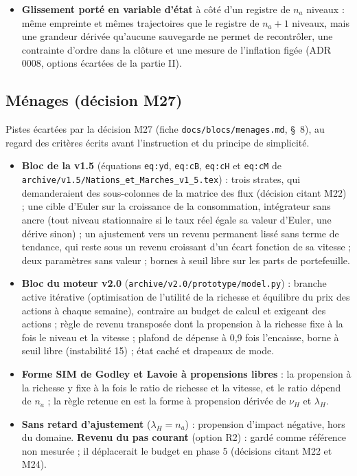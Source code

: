\documentclass[11pt,a4paper]{article}
\begin{document}
\begin{itemize}
\item \textbf{Glissement porté en variable d'état} à côté d'un registre de $n_a$ niveaux : même empreinte et mêmes trajectoires que le registre de $n_a + 1$ niveaux, mais une grandeur dérivée qu'aucune sauvegarde ne permet de recontrôler, une contrainte d'ordre dans la clôture et une mesure de l'inflation figée (ADR 0008, options écartées de la partie II).
\end{itemize}

\subsection*{Ménages (décision M27)}
Pistes écartées par la décision M27 (fiche \nolinkurl{docs/blocs/menages.md}, \S~8), au regard des critères écrits avant l'instruction et du principe de simplicité.
\begin{itemize}
\item \textbf{Bloc de la v1.5} (équations \texttt{eq:yd}, \texttt{eq:cB}, \texttt{eq:cH} et \texttt{eq:cM} de \nolinkurl{archive/v1.5/Nations_et_Marches_v1_5.tex}) : trois strates, qui demanderaient des sous-colonnes de la matrice des flux (décision citant M22) ; une cible d'Euler sur la croissance de la consommation, intégrateur sans ancre (tout niveau stationnaire si le taux réel égale sa valeur d'Euler, une dérive sinon) ; un ajustement vers un revenu permanent lissé sans terme de tendance, qui reste sous un revenu croissant d'un écart fonction de sa vitesse ; deux paramètres sans valeur ; bornes à seuil libre sur les parts de portefeuille.
\item \textbf{Bloc du moteur v2.0} (\texttt{archive/v2.0/prototype/model.py}) : branche active itérative (optimisation de l'utilité de la richesse et équilibre du prix des actions à chaque semaine), contraire au budget de calcul et exigeant des actions ; règle de revenu transposée dont la propension à la richesse fixe à la fois le niveau et la vitesse ; plafond de dépense à 0,9 fois l'encaisse, borne à seuil libre (instabilité 15) ; état caché et drapeaux de mode.
\item \textbf{Forme SIM de Godley et Lavoie à propensions libres} : la propension à la richesse y fixe à la fois le ratio de richesse et la vitesse, et le ratio dépend de $n_a$ ; la règle retenue en est la forme à propension dérivée de $\nu_H$ et $\lambda_H$.
\item \textbf{Sans retard d'ajustement} ($\lambda_H = n_a$) : propension d'impact négative, hors du domaine. \textbf{Revenu du pas courant} (option R2) : gardé comme référence non mesurée ; il déplacerait le budget en phase 5 (décisions citant M22 et M24).

\end{itemize}
\end{document}
